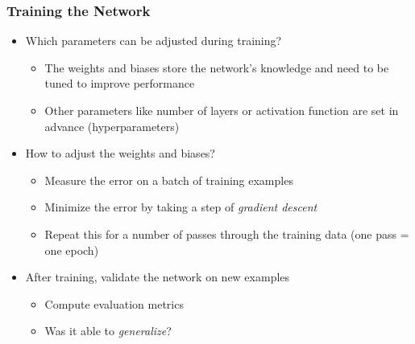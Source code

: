 \begin{frame}
  \frametitle{Training the Network}
  \begin{itemize}
    \item Which parameters can be adjusted during training?
      \begin{itemize}
        \item The weights and biases store the network's knowledge and
          need to be tuned to improve performance
        \item Other parameters like number of layers or activation
          function are set in advance (hyperparameters)
      \end{itemize}
    \item How to adjust the weights and biases?
      \begin{itemize}
        \item Measure the error on a batch of training examples
        \item Minimize the error by taking a step of \textit{gradient
          descent}
        \item Repeat this for a number of passes through the training
          data (one pass = one epoch)
      \end{itemize}
    \item After training, validate the network on new examples
      \begin{itemize}
        \item Compute evaluation metrics
        \item Was it able to \textit{generalize}?
      \end{itemize}
  \end{itemize}
\end{frame}
